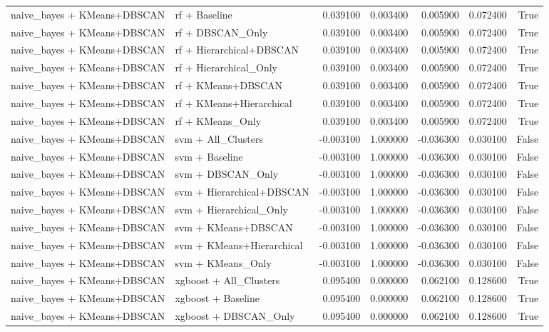 \begin{tabular}{llrrrrr}
naive_bayes + KMeans+DBSCAN & rf + Baseline & 0.039100 & 0.003400 & 0.005900 & 0.072400 & True \\
naive_bayes + KMeans+DBSCAN & rf + DBSCAN_Only & 0.039100 & 0.003400 & 0.005900 & 0.072400 & True \\
naive_bayes + KMeans+DBSCAN & rf + Hierarchical+DBSCAN & 0.039100 & 0.003400 & 0.005900 & 0.072400 & True \\
naive_bayes + KMeans+DBSCAN & rf + Hierarchical_Only & 0.039100 & 0.003400 & 0.005900 & 0.072400 & True \\
naive_bayes + KMeans+DBSCAN & rf + KMeans+DBSCAN & 0.039100 & 0.003400 & 0.005900 & 0.072400 & True \\
naive_bayes + KMeans+DBSCAN & rf + KMeans+Hierarchical & 0.039100 & 0.003400 & 0.005900 & 0.072400 & True \\
naive_bayes + KMeans+DBSCAN & rf + KMeans_Only & 0.039100 & 0.003400 & 0.005900 & 0.072400 & True \\
naive_bayes + KMeans+DBSCAN & svm + All_Clusters & -0.003100 & 1.000000 & -0.036300 & 0.030100 & False \\
naive_bayes + KMeans+DBSCAN & svm + Baseline & -0.003100 & 1.000000 & -0.036300 & 0.030100 & False \\
naive_bayes + KMeans+DBSCAN & svm + DBSCAN_Only & -0.003100 & 1.000000 & -0.036300 & 0.030100 & False \\
naive_bayes + KMeans+DBSCAN & svm + Hierarchical+DBSCAN & -0.003100 & 1.000000 & -0.036300 & 0.030100 & False \\
naive_bayes + KMeans+DBSCAN & svm + Hierarchical_Only & -0.003100 & 1.000000 & -0.036300 & 0.030100 & False \\
naive_bayes + KMeans+DBSCAN & svm + KMeans+DBSCAN & -0.003100 & 1.000000 & -0.036300 & 0.030100 & False \\
naive_bayes + KMeans+DBSCAN & svm + KMeans+Hierarchical & -0.003100 & 1.000000 & -0.036300 & 0.030100 & False \\
naive_bayes + KMeans+DBSCAN & svm + KMeans_Only & -0.003100 & 1.000000 & -0.036300 & 0.030100 & False \\
naive_bayes + KMeans+DBSCAN & xgboost + All_Clusters & 0.095400 & 0.000000 & 0.062100 & 0.128600 & True \\
naive_bayes + KMeans+DBSCAN & xgboost + Baseline & 0.095400 & 0.000000 & 0.062100 & 0.128600 & True \\
naive_bayes + KMeans+DBSCAN & xgboost + DBSCAN_Only & 0.095400 & 0.000000 & 0.062100 & 0.128600 & True \\

\end{tabular}
